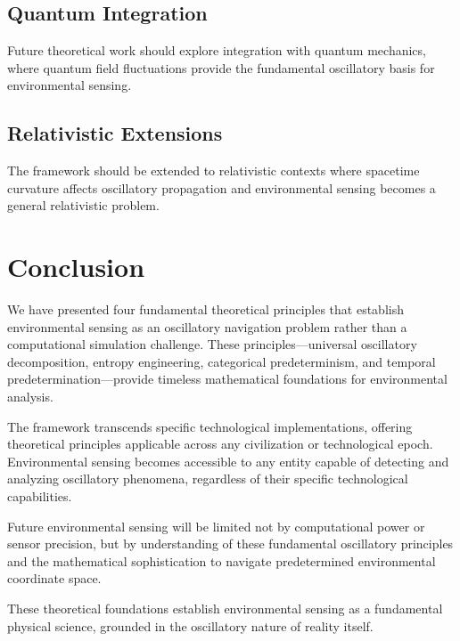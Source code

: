 \documentclass[12pt,a4paper]{article}
\begin{document}
\subsection{Quantum Integration}

Future theoretical work should explore integration with quantum mechanics, where quantum field fluctuations provide the fundamental oscillatory basis for environmental sensing.

\subsection{Relativistic Extensions}

The framework should be extended to relativistic contexts where spacetime curvature affects oscillatory propagation and environmental sensing becomes a general relativistic problem.

\section{Conclusion}

We have presented four fundamental theoretical principles that establish environmental sensing as an oscillatory navigation problem rather than a computational simulation challenge. These principles—universal oscillatory decomposition, entropy engineering, categorical predeterminism, and temporal predetermination—provide timeless mathematical foundations for environmental analysis.

The framework transcends specific technological implementations, offering theoretical principles applicable across any civilization or technological epoch. Environmental sensing becomes accessible to any entity capable of detecting and analyzing oscillatory phenomena, regardless of their specific technological capabilities.

Future environmental sensing will be limited not by computational power or sensor precision, but by understanding of these fundamental oscillatory principles and the mathematical sophistication to navigate predetermined environmental coordinate space.

These theoretical foundations establish environmental sensing as a fundamental physical science, grounded in the oscillatory nature of reality itself.
\end{document}

